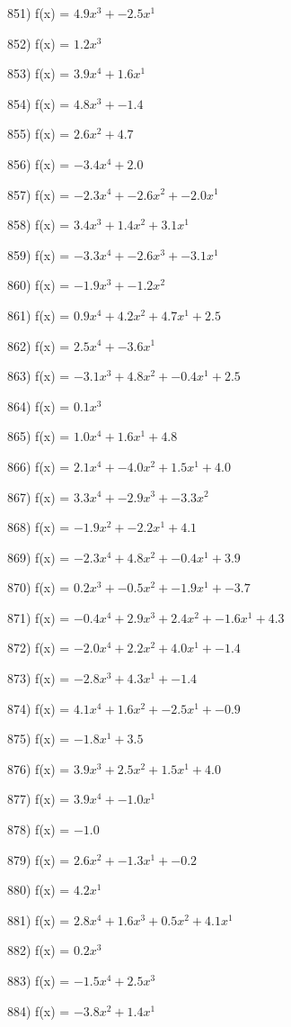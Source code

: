 \documentclass[10pt,a4paper]{article}
\begin{document}
851) f(x) = $4.9x^3 + -2.5x^1$

852) f(x) = $1.2x^3$

853) f(x) = $3.9x^4 + 1.6x^1$

854) f(x) = $4.8x^3 + -1.4$

855) f(x) = $2.6x^2 + 4.7$

856) f(x) = $-3.4x^4 + 2.0$

857) f(x) = $-2.3x^4 + -2.6x^2 + -2.0x^1$

858) f(x) = $3.4x^3 + 1.4x^2 + 3.1x^1$

859) f(x) = $-3.3x^4 + -2.6x^3 + -3.1x^1$

860) f(x) = $-1.9x^3 + -1.2x^2$

861) f(x) = $0.9x^4 + 4.2x^2 + 4.7x^1 + 2.5$

862) f(x) = $2.5x^4 + -3.6x^1$

863) f(x) = $-3.1x^3 + 4.8x^2 + -0.4x^1 + 2.5$

864) f(x) = $0.1x^3$

865) f(x) = $1.0x^4 + 1.6x^1 + 4.8$

866) f(x) = $2.1x^4 + -4.0x^2 + 1.5x^1 + 4.0$

867) f(x) = $3.3x^4 + -2.9x^3 + -3.3x^2$

868) f(x) = $-1.9x^2 + -2.2x^1 + 4.1$

869) f(x) = $-2.3x^4 + 4.8x^2 + -0.4x^1 + 3.9$

870) f(x) = $0.2x^3 + -0.5x^2 + -1.9x^1 + -3.7$

871) f(x) = $-0.4x^4 + 2.9x^3 + 2.4x^2 + -1.6x^1 + 4.3$

872) f(x) = $-2.0x^4 + 2.2x^2 + 4.0x^1 + -1.4$

873) f(x) = $-2.8x^3 + 4.3x^1 + -1.4$

874) f(x) = $4.1x^4 + 1.6x^2 + -2.5x^1 + -0.9$

875) f(x) = $-1.8x^1 + 3.5$

876) f(x) = $3.9x^3 + 2.5x^2 + 1.5x^1 + 4.0$

877) f(x) = $3.9x^4 + -1.0x^1$

878) f(x) = $-1.0$

879) f(x) = $2.6x^2 + -1.3x^1 + -0.2$

880) f(x) = $4.2x^1$

881) f(x) = $2.8x^4 + 1.6x^3 + 0.5x^2 + 4.1x^1$

882) f(x) = $0.2x^3$

883) f(x) = $-1.5x^4 + 2.5x^3$

884) f(x) = $-3.8x^2 + 1.4x^1$
\end{document}
